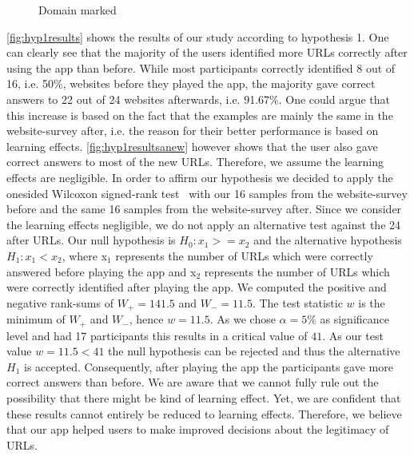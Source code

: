 \begin{figure}
\centering
{}
\caption{Domain marked}
\label{fig:hyp3results}
\end{figure}

\begin{description}[leftmargin=0cm]
\item[Hypothesis 1:]
\autoref{fig:hyp1results} shows the results of our study according to hypothesis 1. One can clearly see that the majority of the users identified more URLs correctly after using the app than before. While most participants correctly identified 8 out of 16, i.e. 50\%, websites before they played the app, the majority gave correct answers to 22 out of 24 websites afterwards, i.e. 91.67\%. One could argue that this increase is based on the fact that the examples are mainly the same in the website-survey after, i.e. the reason for their better performance is based on learning effects. \autoref{fig:hyp1resultsanew} however shows that the user also gave correct answers to most of the new URLs. Therefore, we assume the learning effects are negligible.
In order to affirm our hypothesis we decided to apply the onesided Wilcoxon signed-rank test~\cite{wilcoxon1945individual} with our 16 samples from the website-survey before and the same 16 samples from the website-survey after.
Since we consider the learning effects negligible, we do not apply an alternative test against the 24 after URLs.
Our null hypothesis is $H_{0}: x_{1} >= x_{2}$ and the alternative hypothesis $H_{1}: x_{1} < x_{2}$, where x$_{1}$ represents the number of URLs which were correctly answered before playing the app and x$_{2}$ represents the number of URLs which were correctly identified after playing the app.
We computed the positive and negative rank-sums of $W_{+} = 141.5$ and $W_{-} = 11.5$.
The test statistic $w$ is the minimum of $W_{+}$ and $W_{-}$, hence $w = 11.5$.
As we chose $\alpha = 5\%$ as significance level and had 17 participants this results in a critical value of $41$.
As our test value $w = 11.5 < 41$ the null hypothesis can be rejected and thus the alternative $H_{1}$ is accepted.
Consequently, after playing the app the participants gave more correct answers than before.
We are aware that we cannot fully rule out the possibility that there might be kind of learning effect.
Yet, we are confident that these results cannot entirely be reduced to learning effects.
Therefore, we believe that our app helped users to make improved decisions about the legitimacy of URLs.

\end{description}
